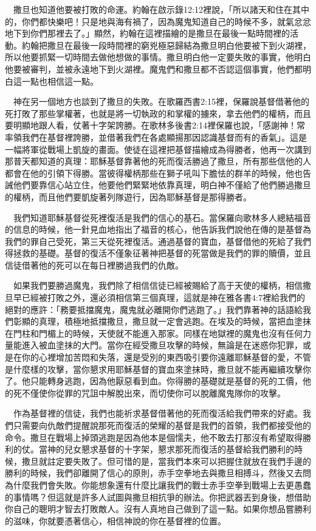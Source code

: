 \documentclass{book}
\begin{document}
　撒旦也知道他要被打敗的命運。約翰在啟示錄12:12裡說，「所以諸天和住在其中的，你們都快樂吧！只是地與海有禍了，因為魔鬼知道自己的時候不多，就氣忿忿地下到你們那裡去了。」顯然，約翰在這裡描繪的是撒旦在最後一點時間裡的活動。約翰把撒旦在最後一段時間裡的窮兇極惡歸結為撒旦明白他要被下到火湖裡，所以他要抓緊一切時間去做他想做的事情。撒旦明白他一定要失敗的事實，他明白他要被審判，並被永遠地下到火湖裡。魔鬼們和撒旦都不否認這個事實，他們都明白這一點也相信這一點。

　神在另一個地方也談到了撒旦的失敗。在歌羅西書2:15裡，保羅說基督借著他的死打敗了那些掌權著，也就是將一切執政的和掌權的擄來，拿去他們的權柄，而且要明顯地跟人看，仗著十字架誇勝。在歌林多後書2:14裡保羅也說，「感謝神！常率領我們在基督裡誇勝，並借著我們在各處顯揚那因認識基督而有的香氣」。這是一幅將軍從戰場上凱旋的畫面。使徒在這裡把基督描繪成為得勝者，他再一次講到那普天都知道的真理：耶穌基督靠著他的死而復活勝過了撒旦，所有那些信他的人都會在他的引領下得勝。當彼得權柄那些在獅子吼叫下膽怯的群羊的時候，他也告誡他們要靠信心站立住，他要他們緊緊地依靠真理，明白神不僅給了他們勝過撒旦的權柄，而且他們要凱旋著列隊遊行，因為耶穌基督是那得勝者。

　我們知道耶穌基督從死裡復活是我們的信心的基石。當保羅向歌林多人總結福音的信息的時候，他一針見血地指出了福音的核心，他告訴我們說他在傳的是基督為我們的罪自己受死，第三天從死裡復活。通過基督的寶血，基督借他的死給了我們得拯救的基礎。基督的復活不僅象征著神把基督的死當做是我們的罪的贖價，並且信徒借著他的死可以在每日裡勝過我們的仇敵。

　如果我們要勝過魔鬼，我們除了相信信徒已經被賜給了高于天使的權柄，相信撒旦早已經被打敗之外，還必須相信第三個真理，這就是神在雅各書4:7裡給我們的絕對的應許：「務要抵擋魔鬼，魔鬼就必離開你們逃跑了。」我們靠著神的話語給我們彰顯的真理，積極地抵擋撒旦，撒旦就一定會逃跑。在埃及的時候，當把血塗抹在門柱和門楣上的時候，天使就不能進入那家。同樣在地獄裡的魔鬼也沒有任何力量能進入被血塗抹的大門。當你在經受撒旦攻擊的時候，無論是在迷惑你犯罪，或是在你的心裡增加苦悶和失落，還是受別的東西吸引要你遠離耶穌基督的愛，不管是什麼樣的攻擊，當你懇求用耶穌基督的寶血來塗抹時，撒旦就不能再繼續攻擊你了。他只能轉身逃跑，因為他厭惡看到血。你得勝的基礎就是基督的死的工價，他的死不僅使你從罪的咒詛中解脫出來，而切使你可以脫離魔鬼隊你的攻擊。

　作為基督裡的信徒，我們也能祈求基督借著他的死而復活給我們帶來的好處。我們只需要向仇敵們提醒說那死而復活的榮耀的基督是我們的首領，我們都接受他的命令。撒旦在戰場上掉頭逃跑是因為他本是個懦夫，他不敢去打那沒有希望取得勝利的仗。當神的兒女懇求基督的十字架，懇求那死而復活的基督給我們勝利的時候，撒旦就註定要失敗了。但可惜的是，當我們本來可以把握住就放在我們手邊的勝利的時候，我們卻離開了信心的原則，赤手空拳地去與撒旦相搏斗，然後又去問為什麼我們會失敗。你能想象還有什麼比讓我們的戰士赤手空拳到戰場上去更愚蠢的事情嗎？但這就是許多人試圖與撒旦相抗爭的辦法。你把武器丟到身後，想借助你自己的聰明才智去打敗敵人。沒有人真地自己做到了這一點。如果你想品嘗勝利的滋味，你就要憑著信心，相信神說的你在基督裡的位置。
\end{document}

